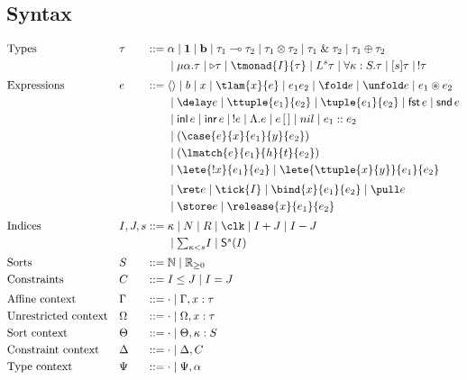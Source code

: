 \subsection{Syntax}
\[
\begin{alignedat}{3}
 &\text{Types} &\quad &\tau &\;::={}&
   \alpha\mid\textbf{1}\mid\textbf{b}\mid\tau_1\multimap\tau_2
   \mid\tau_1\otimes\tau_2\mid\tau_1\;\&\;\tau_2\mid\tau_1\oplus\tau_2\\
 &&&&&\mid\mu\alpha.\tau\mid\triangleright\tau\mid\tmonad{I}{\tau}
   \mid L^s\tau\mid\forall\kappa:S.\tau\mid[s]\tau\mid\,!\tau\\[.6ex]
 &\text{Expressions} &&e &\;::={}&\langle\rangle\mid b \mid x \mid \tlam{x}{e}\mid e_1e_2
   \mid\fold e\mid\unfold e\mid e_1\circledast e_2\\
 &&&&&\mid\delay e\mid\ttuple{e_1}{e_2} \mid \tuple{e_1}{e_2}
   \mid\mathsf{fst}\,e\mid\mathsf{snd}\,e\\
 &&&&&\mid\mathsf{inl}\,e\mid\mathsf{inr}\,e\mid \,!e\mid \Lambda.e \mid e\,[\,]\mid nil \mid e_1::e_2\\
 &&&&&\mid(\case{e}{x}{e_1}{y}{e_2})\\
 &&&&&\mid(\lmatch{e}{e_1}{h}{t}{e_2})\\
 &&&&&\mid\lete{!x}{e_1}{e_2}\mid\lete{\ttuple{x}{y}}{e_1}{e_2}\\[.6ex]
 &&&&&\mid\ret e\mid\tick{I}\mid\bind{x}{e_1}{e_2}\mid\pull e\\
 &&&&&\mid\store e\mid\release{x}{e_1}{e_2}\\[.6ex]
 &\text{Indices} &&I,J,s&\;::={}&\kappa\mid N\mid R\mid\clk\mid I+J\mid I-J\\
 &&&&&\mid\textstyle{\sum}_{\kappa<s}I\mid\mathsf{S}^s(I)\\[.6ex]
 &\text{Sorts} &&S &\;::={}&\mathbb N\mid\mathbb R_{\ge0} \\
 &\text{Constraints} &&C &\;::={}&I\leq J\mid I=J\\[.6ex]
 &\text{Affine context} &&\Gamma &\;::={}&\cdot\mid\Gamma,x:\tau\\
 &\text{Unrestricted context} &&\Omega &\;::={}&\cdot\mid\Omega,x:\tau\\
 &\text{Sort context} &&\Theta &\;::={}&\cdot\mid\Theta,\kappa:S\\
 &\text{Constraint context} &&\Delta &\;::={}&\cdot\mid\Delta,C\\
 &\text{Type context} &&\Psi &\;::={}&\cdot\mid\Psi,\alpha
\end{alignedat}
\]

